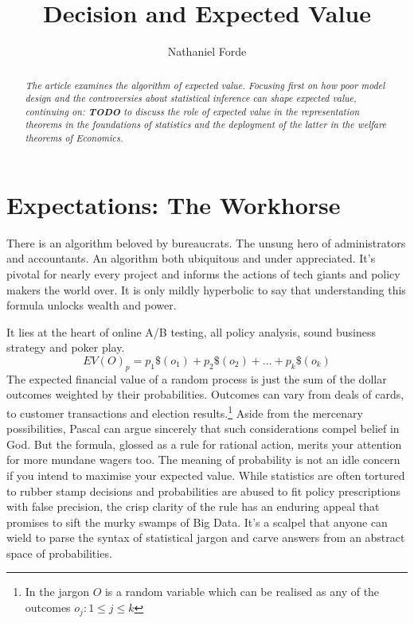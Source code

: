 \documentclass[10pt,a4paper,notitlepage, twocolumn]{article}
\author{Nathaniel Forde}
\title{Decision and Expected Value}
\begin{document}
\begin{abstract}
\textit{The article examines the algorithm of expected value. Focusing first on how poor model design and the controversies about statistical inference can shape expected value, continuing on: \textbf{TODO} to discuss the role of expected value in the representation theorems in the foundations of statistics and the deployment of the latter in the welfare theorems of Economics. }
\end{abstract}

\section*{Expectations: The Workhorse}
There is an algorithm beloved by bureaucrats. The unsung hero of administrators and accountants. An algorithm both ubiquitous and under appreciated. It's pivotal for nearly every project and informs the actions of tech giants and policy makers the world over. It is only mildly hyperbolic to say that understanding this formula unlocks wealth and power. 

It lies at the heart of online A/B testing, all policy analysis, sound business strategy and poker play. 
$$ EV(O)_{p} = p_{1}\$(o_{1}) + p_{2}\$(o_{2}) + ... + p_{k}\$(o_{k}) $$
The expected financial value of a random process is just the sum of the dollar outcomes weighted by their probabilities. 
Outcomes can vary from deals of cards, to customer transactions and election results.\footnote{In the jargon $O$ is a random variable which can be realised as any of the outcomes  $ o_{j} :  1 \leq j \leq k$} Aside from the mercenary possibilities, Pascal can argue sincerely that such considerations compel belief in God. But the formula, glossed as a rule for rational action, merits your attention for more mundane wagers too. The meaning of probability is not an idle concern if you intend to maximise your expected value. While statistics are often tortured to rubber stamp decisions and probabilities are abused to fit policy prescriptions with false precision, the crisp clarity of the rule has an enduring appeal that promises to sift the murky swamps of Big Data. It's a scalpel that anyone can wield to parse the syntax of statistical jargon and carve answers from an abstract space of  probabilities.
\end{document}
